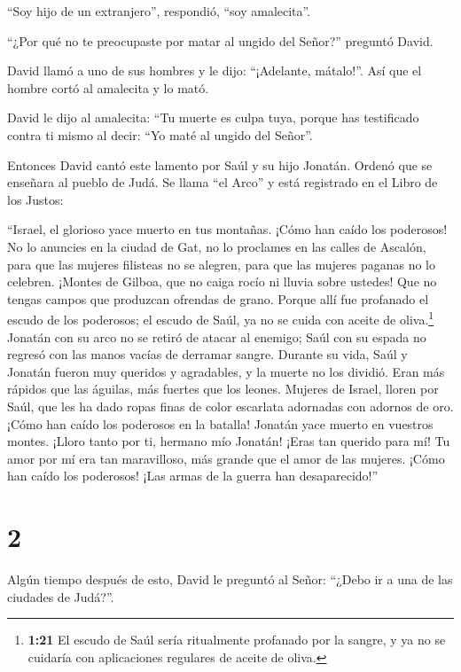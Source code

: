 ``Soy hijo de un extranjero'', respondió, ``soy amalecita''.

 ``¿Por qué no te preocupaste por matar al ungido del
Señor?'' preguntó David.

 David llamó a uno de sus hombres y le dijo: ``¡Adelante,
mátalo!''. Así que el hombre cortó al amalecita y lo mató.

 David le dijo al amalecita: ``Tu muerte es culpa tuya,
porque has testificado contra ti mismo al decir: ``Yo maté al ungido del
Señor''.

 Entonces David cantó este lamento por Saúl y su hijo
Jonatán.  Ordenó que se enseñara al pueblo de Judá. Se
llama ``el Arco'' y está registrado en el Libro de los Justos:

 ``Israel, el glorioso yace muerto en tus montañas. ¡Cómo
han caído los poderosos!  No lo anuncies en la ciudad de
Gat, no lo proclames en las calles de Ascalón, para que las mujeres
filisteas no se alegren, para que las mujeres paganas no lo celebren.
 ¡Montes de Gilboa, que no caiga rocío ni lluvia sobre
ustedes! Que no tengas campos que produzcan ofrendas de grano. Porque
allí fue profanado el escudo de los poderosos; el escudo de Saúl, ya no
se cuida con aceite de oliva.\footnote{\textbf{1:21} El escudo de Saúl
  sería ritualmente profanado por la sangre, y ya no se cuidaría con
  aplicaciones regulares de aceite de oliva.}  Jonatán con
su arco no se retiró de atacar al enemigo; Saúl con su espada no regresó
con las manos vacías de derramar sangre.  Durante su vida,
Saúl y Jonatán fueron muy queridos y agradables, y la muerte no los
dividió. Eran más rápidos que las águilas, más fuertes que los leones.
 Mujeres de Israel, lloren por Saúl, que les ha dado ropas
finas de color escarlata adornadas con adornos de oro. 
¡Cómo han caído los poderosos en la batalla! Jonatán yace muerto en
vuestros montes.  ¡Lloro tanto por ti, hermano mío Jonatán!
¡Eras tan querido para mí! Tu amor por mí era tan maravilloso, más
grande que el amor de las mujeres.  ¡Cómo han caído los
poderosos! ¡Las armas de la guerra han desaparecido!''

\hypertarget{section-1}{%
\section{2}\label{section-1}}

 Algún tiempo después de esto, David le preguntó al Señor:
``¿Debo ir a una de las ciudades de Judá?''.

